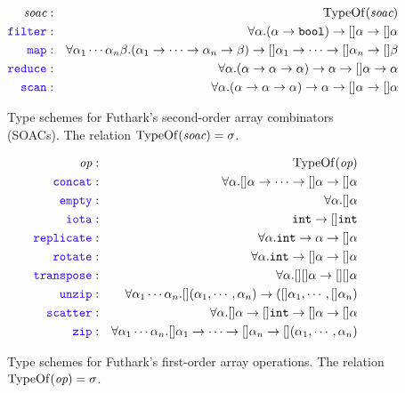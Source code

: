 \documentclass[oneside,11pt]{book}
\begin{document}
\begin{figure}
  \begin{eqnarray*}
\id{soac} & : & \mathrm{TypeOf}(\id{soac}) \\
    \fop{filter} & : & \forall \alpha. (\alpha \rarr \mathtt{bool}) \rarr []\alpha \rarr []\alpha\\
    \fop{map} & : & \forall \alpha_1\cdots\alpha_n\beta. (\alpha_1\rarr\cdots\rarr\alpha_n \rarr \beta) \rarr []\alpha_1 \rarr\cdots\rarr []\alpha_n \rarr []\beta\\
    \fop{reduce} & : & \forall \alpha. (\alpha \rarr \alpha \rarr \alpha) \rarr \alpha \rarr []\alpha \rarr \alpha\\
    \fop{scan} & : & \forall \alpha. (\alpha \rarr \alpha \rarr \alpha) \rarr \alpha \rarr []\alpha \rarr []\alpha\\
  \end{eqnarray*}
  \caption{Type schemes for Futhark's second-order array combinators (SOACs). The relation $\mathrm{TypeOf}(\mbox{\it{soac}}) = \sigma$.}
  \label{fig:soactypeschemes}
\end{figure}

\begin{figure}
  \begin{eqnarray*}
\id{op} & : & \mathrm{TypeOf}(\id{op}) \\
    \fop{concat} & : & \forall \alpha. []\alpha \rarr \cdots \rarr []\alpha \rarr []\alpha \\
    \fop{empty} & : & \forall \alpha. []\alpha \\
    \fop{iota} & : & \kw{int} \rarr []\kw{int} \\
    \fop{replicate} & : & \forall \alpha. \kw{int} \rarr \alpha \rarr []\alpha\\
    \fop{rotate} & : & \forall \alpha. \kw{int} \rarr []\alpha \rarr []\alpha\\
    \fop{transpose} & : & \forall \alpha. [][]\alpha \rarr [][]\alpha\\
    \fop{unzip} & : & \forall \alpha_1\cdots\alpha_n. [](\alpha_1,\cdots,\alpha_n) \rarr ([]\alpha_1,\cdots,[]\alpha_n) \\
    \fop{scatter} & : & \forall \alpha. []\alpha \rarr []\kw{int} \rarr []\alpha \rarr []\alpha \\
    \fop{zip} & : & \forall \alpha_1\cdots\alpha_n. []\alpha_1\rarr\cdots\rarr[]\alpha_n \rarr [](\alpha_1,\cdots,\alpha_n)
  \end{eqnarray*}
  \caption{Type schemes for Futhark's first-order array operations. The relation $\mathrm{TypeOf}(\mbox{\it{op}}) = \sigma$.}
  \label{fig:foactypeschemes}
\end{figure}
\end{document}
